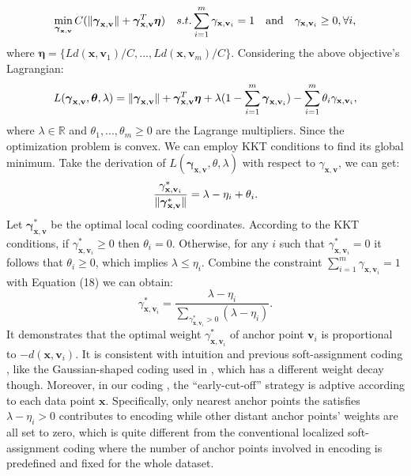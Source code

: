 \documentclass{llncs}
\DeclarePairedDelimiter\norm{\lVert}{\rVert}
\def \x {\mathbf{x}}
\def \v {\mathbf{v}}
\begin{document}
	\begin{equation}
	\min_{\boldsymbol{\gamma}_{\x,\v}} C(\norm{\boldsymbol{\gamma}_{\x,\v}} + \boldsymbol{\gamma}_{\x,\v}^T \boldsymbol{\eta}) \quad s.t. \sum_{i=1}^m\gamma_{\x,\v_i}=1 \quad \mbox{and} \quad \gamma_{\x,\v_i} \geq 0, \forall i,
	\end{equation}
	where $\boldsymbol{\eta}=\{Ld(\x,\v_1)/C,...,Ld(\x,\v_m)/C\}$. Considering the above objective's Lagrangian:
	\begin{equation*}
	L(\boldsymbol{\gamma}_{\x,\v},\boldsymbol{\theta},\lambda) = \norm{\boldsymbol{\gamma}_{\x,\v}} + \boldsymbol{\gamma}_{\x,\v}^T \boldsymbol{\eta} + \lambda(1-\sum_{i=1}^m\boldsymbol{\gamma}_{\x,\v_i}) - \sum_{i=1}^m\theta_i\gamma_{\x,\v_i},
	\end{equation*}
	where $\lambda \in \mathbb{R}$ and $\theta_1,...,\theta_m \geq 0$ are the Lagrange multipliers. Since the optimization problem is convex. We can employ KKT conditions to find its global minimum. Take the derivation of $L(\boldsymbol{\gamma}_{\x,\v},\theta,\lambda)$ with respect to $\gamma_{\x,\v}$, we can get: 
	\begin{equation}
	\frac{{\gamma}_{\x,\v_i}^*}{\norm{\boldsymbol{\gamma}_{\x,\v}^*}} = \lambda - \eta_i + \theta_i.
	\end{equation}
	Let $\boldsymbol{\gamma}_{\x,\v}^*$ be the optimal local coding coordinates. According to the KKT conditions, if $\gamma_{\x,\v_i}^* \ge 0$ then $\theta_i=0$. Otherwise, for any $i$ such that $\gamma_{\x,\v_i}^* = 0$ it follows that $\theta_i \geq 0$, which implies $\lambda \leq \eta_i$. Combine the constraint $\sum_{i=1}^m\gamma_{\x,\v_i}=1$ with Equation (18) we can obtain:
	\begin{equation}
	\gamma_{\x,\v_i}^* = \frac{\lambda-\eta_i}{\sum_{\gamma_{\x,\v_i}^*>0}(\lambda-\eta_i)}.
	\end{equation}
	It demonstrates that the optimal weight $\gamma_{\x,\v_i}^*$ of anchor point $\v_i$ is proportional to $-d(\x,\v_i)$. It is consistent with intuition and previous soft-assignment coding , like the Gaussian-shaped coding  used in \cite{4}, which has a different weight decay though. Moreover, in our coding , the ``early-cut-off'' strategy is adptive according to each data point $\x$. Specifically, only nearest anchor points the satisfies $\lambda-\eta_i>0$ contributes to encoding while other distant anchor points' weights are all set to zero, which is quite different from the conventional localized soft-assignment coding where the number of anchor points involved in encoding is predefined and fixed for the whole dataset.
	
\end{document}
